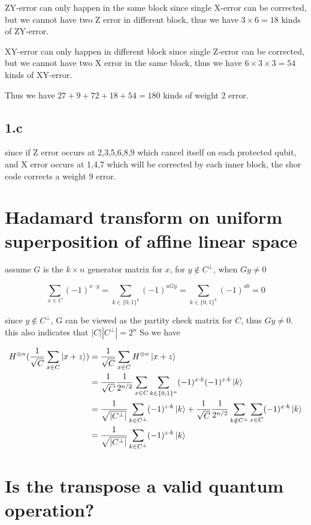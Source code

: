 \documentclass{article}
\begin{document}
ZY-error can only happen in the same block since single X-error can be corrected, but
we cannot have two Z error in different block, thus we have $3\times 6 = 18$ kinds of ZY-error.

XY-error can only happen in different block since single Z-error can be corrected, but
we cannot have two X error in the same block, thus we have $6\times 3 \times 3 = 54$ kinds of XY-error.

Thus we have $27 + 9 + 72 + 18 + 54 = 180$ kinds of weight 2 error.

\subsection*{1.c}
since if Z error occurs at 2,3,5,6,8,9 which cancel itself on each protected qubit, and X
error occurs at 1,4,7 which will be corrected by each inner block, the shor code corrects
a weight 9 error.

\section*{Hadamard transform on uniform superposition of affine linear space}
assume $G$ is the $k\times n$ generator matrix for $x$, for $y \notin C^{\perp}$,
when $Gy \neq 0$

$$
\sum_{x\in C} (-1)^{x\cdot y} = \sum_{k\in \{0, 1\}^k} (-1)^{a G y} = \sum_{k\in \{0, 1\}^k} (-1)^{ab} = 0
$$

since $y \notin C^{\perp}$, G can be viewed as the partity check matrix for $C$, thus $Gy\neq 0$. 
this also indicates that $|C| |C^{\perp}| = 2^n$ So we
have

$$
\begin{aligned}
    H^{\otimes n} (\frac{1}{\sqrt{C}}\sum_{x\in C} \ket{x+z}) &= \frac{1}{\sqrt{C}} \sum_{x\in C} H^{\otimes n}\ket{x+z}\\
    &= \frac{1}{\sqrt{C}} \frac{1}{2^{n/2}} \sum_{x\in C} \sum_{k \in \{0, 1\}^n} (-1)^{x\cdot k} (-1)^{z\cdot k}\ket{k}\\
    &= \frac{1}{\sqrt{|C^{\perp}|}}\sum_{k \in C^{\perp}}(-1)^{z\cdot k} \ket{k} + \frac{1}{\sqrt{C}} \frac{1}{2^{n/2}} \sum_{k \notin C^{\perp}} \sum_{x\in C} (-1)^{x\cdot k}\ket{k}\\
    &= \frac{1}{\sqrt{|C^{\perp}|}}\sum_{k \in C^{\perp}}(-1)^{z\cdot k} \ket{k}
\end{aligned}
$$

\section*{Is the transpose a valid quantum operation?}
\end{document}
